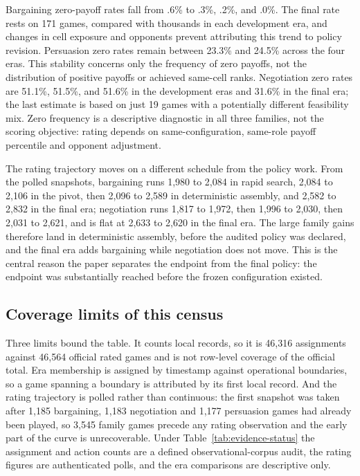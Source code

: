 Bargaining zero-payoff rates fall from .6\% to .3\%, .2\%, and .0\%.
The final rate rests on 171 games, compared with thousands in each development
era, and changes in cell exposure and opponents prevent attributing this trend
to policy revision. Persuasion zero rates remain between 23.3\% and 24.5\%
across the four eras. This stability concerns only the frequency of zero
payoffs, not the distribution of positive payoffs or achieved same-cell ranks.
Negotiation zero rates are 51.1\%, 51.5\%, and 51.6\% in the development eras
and 31.6\% in the final era; the last estimate is based on just 19 games with
a potentially different feasibility mix. Zero frequency is a descriptive
diagnostic in all three families, not the scoring objective: rating depends on
same-configuration, same-role payoff percentile and opponent adjustment.

The rating trajectory moves on a different schedule from the policy work. From
the polled snapshots, bargaining runs 1,980 to 2,084 in rapid search, 2,084 to
2,106 in the pivot, then 2,096 to 2,589 in deterministic assembly, and 2,582 to
2,832 in the final era; negotiation runs 1,817 to 1,972, then 1,996 to 2,030,
then 2,031 to 2,621, and is flat at 2,633 to 2,620 in the final era. The large
family gains therefore land in deterministic assembly, before the audited
policy was declared, and the final era adds bargaining while negotiation does
not move. This is the central reason the paper separates the endpoint from the
final policy: the endpoint was substantially reached before the frozen
configuration existed.

\subsection{Coverage limits of this census}

Three limits bound the table. It counts local records, so it is 46,316
assignments against 46,564 official rated games and is not row-level coverage
of the official total. Era membership is assigned by timestamp against
operational boundaries, so a game spanning a boundary is attributed by its
first local record. And the rating trajectory is polled rather than continuous:
the first snapshot was taken after 1,185 bargaining, 1,183 negotiation and
1,177 persuasion games had already been played, so 3,545 family games precede
any rating observation and the early part of the curve is unrecoverable. Under
Table~\ref{tab:evidence-status} the assignment and action counts are a defined
observational-corpus audit, the rating figures are authenticated polls, and the
era comparisons are descriptive only.

